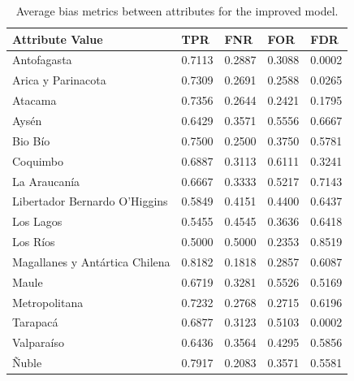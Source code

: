 \documentclass[twoside,11pt]{article}
\begin{document}
\begin{table}[ht]
\centering
\begin{tabular}{|p{3.5cm}|p{1cm}|p{1cm}|p{1cm}|p{1cm}|}
\hline

    \textbf{Attribute Value} &      \textbf{TPR} &      \textbf{FNR} &    \textbf{FOR} &    \textbf{FDR} \\ \hline

                   Antofagasta &   0.7113 &   0.2887 & 0.3088 & 0.0002 \\
            Arica y Parinacota &   0.7309 &   0.2691 & 0.2588 & 0.0265 \\
                       Atacama &   0.7356 &   0.2644 & 0.2421 & 0.1795 \\
                         Aysén &   0.6429 &   0.3571 & 0.5556 & 0.6667 \\
                       Bio Bío &   0.7500 &   0.2500 & 0.3750 & 0.5781 \\
                      Coquimbo &   0.6887 &   0.3113 & 0.6111 & 0.3241 \\
                  La Araucanía &   0.6667 &   0.3333 & 0.5217 & 0.7143 \\
 Libertador Bernardo O'Higgins &   0.5849 &   0.4151 & 0.4400 & 0.6437 \\
                     Los Lagos &   0.5455 &   0.4545 & 0.3636 & 0.6418 \\
                      Los Ríos &   0.5000 &   0.5000 & 0.2353 & 0.8519 \\
Magallanes y Antártica Chilena &   0.8182 &   0.1818 & 0.2857 & 0.6087 \\
                         Maule &   0.6719 &   0.3281 & 0.5526 & 0.5169 \\
                 Metropolitana &   0.7232 &   0.2768 & 0.2715 & 0.6196 \\
                      Tarapacá &   0.6877 &   0.3123 & 0.5103 & 0.0002 \\
                    Valparaíso &   0.6436 &   0.3564 & 0.4295 & 0.5856 \\
                         Ñuble &   0.7917 & 0.2083 & 0.3571 & 0.5581 \\

\hline
\end{tabular}
\caption{Average bias metrics between attributes for the improved model.}
\end{table}



\clearpage

\end{document}
